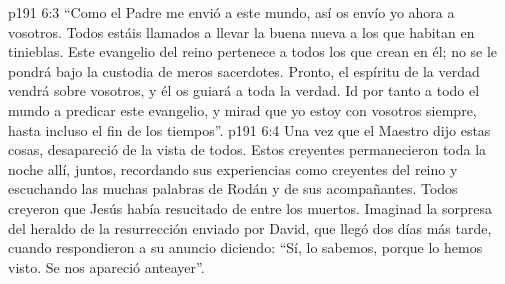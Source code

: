 \vs p191 6:3 “Como el Padre me envió a este mundo, así os envío yo ahora a vosotros. Todos estáis llamados a llevar la buena nueva a los que habitan en tinieblas. Este evangelio del reino pertenece a todos los que crean en él; no se le pondrá bajo la custodia de meros sacerdotes. Pronto, el espíritu de la verdad vendrá sobre vosotros, y él os guiará a toda la verdad. Id por tanto a todo el mundo a predicar este evangelio, y mirad que yo estoy con vosotros siempre, hasta incluso el fin de los tiempos”.
\vs p191 6:4 Una vez que el Maestro dijo estas cosas, desapareció de la vista de todos. Estos creyentes permanecieron toda la noche allí, juntos, recordando sus experiencias como creyentes del reino y escuchando las muchas palabras de Rodán y de sus acompañantes. Todos creyeron que Jesús había resucitado de entre los muertos. Imaginad la sorpresa del heraldo de la resurrección enviado por David, que llegó dos días más tarde, cuando respondieron a su anuncio diciendo: “Sí, lo sabemos, porque lo hemos visto. Se nos apareció anteayer”.
